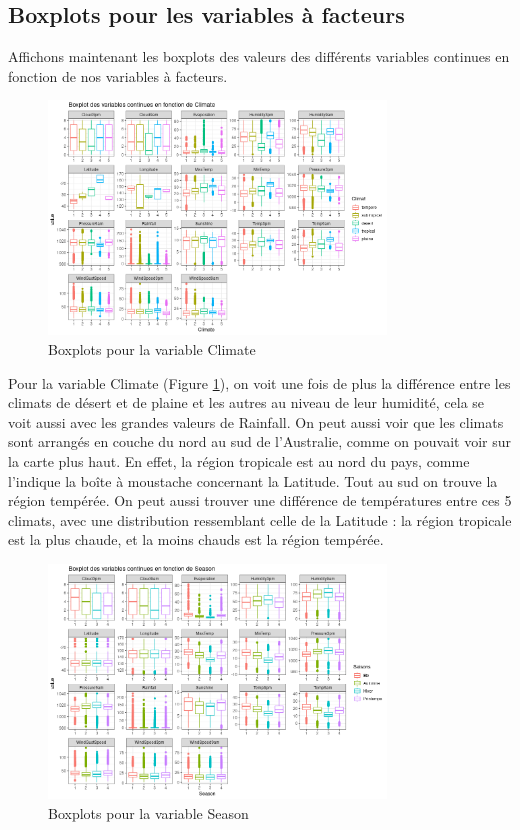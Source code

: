 \documentclass{article}
\begin{document}
\subsection{Boxplots pour les variables à facteurs}

Affichons maintenant les boxplots des valeurs des différents variables continues en fonction de nos variables à facteurs. 

\begin{figure}[htp]
    \centering
    \includegraphics[width=0.8\textwidth]{Images/boxplots/boxplot_Climate.png}
    \caption{Boxplots pour la variable Climate}
    \label{fig:bp_climate}
\end{figure}

Pour la variable Climate (Figure \ref{fig:bp_climate}), on voit une fois de plus la différence entre les climats de désert et de plaine et les autres au niveau de leur humidité, cela se voit aussi avec les grandes valeurs de Rainfall. On peut aussi voir que les climats sont arrangés en couche du nord au sud de l'Australie, comme on pouvait voir sur la carte plus haut. En effet, la région tropicale est au nord du pays, comme l'indique la boîte à moustache concernant la Latitude. Tout au sud on trouve la région tempérée. On peut aussi trouver une différence de températures entre ces 5 climats, avec une distribution ressemblant celle de la Latitude : la région tropicale est la plus chaude, et la moins chauds est la région tempérée. 

\begin{figure}[htp]
    \centering
    \includegraphics[width=0.8\textwidth]{Images/boxplots/boxplot_Season.png}
    \caption{Boxplots pour la variable Season}
    \label{fig:bp_season}
\end{figure}
\end{document}
